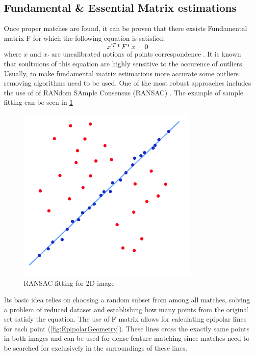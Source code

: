 \subsection{Fundamental \& Essential Matrix estimations}
Once proper matches are found, it can be proven that there exsists Fundamental matrix F for which the following equation is satisfied:
\begin{equation} \label{eq:fundamntalEquation}
{x}^{'T} * F * x = 0
\end{equation} 
where $x$ and ${x}_{'}$ are uncalibrated notions of points correspondence \cite{HartleyMultipleView}. It is known that soultuions of this equation are highly sensitive to the occurence of outliers. Usually, to make fundamental matrix estimations more accurate some outliers removing algorithms need to be used. One of the most robust approaches includes the use of of RANdom SAmple Consensus (RANSAC) \cite{website:ransac}. The example of sample fitting can be seen in \ref{fig:RANSACFitting}
\begin{figure}[p]
    \centering
    \includegraphics[width=0.8\textwidth]{RANSACFitting}
    \caption{RANSAC fitting for 2D image\cite{website:ransac}}
    \label{fig:RANSACFitting}
\end{figure}
Its basic idea relies on choosing a random subset from among all matches, solving a problem of reduced dataset and establishing how many points from the original set satisfy the equation.
The use of F matrix allows for calculating epipolar lines for each point (\ref{fig:EpipolarGeometry}). These lines cross the exactly same points in both images and can be used for dense feature matching since matches need to be searched for exclusively in the surroundings of these lines.
